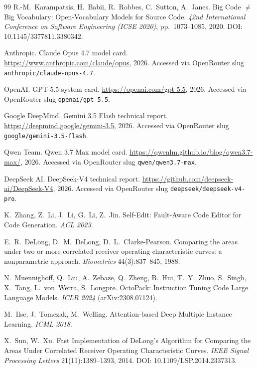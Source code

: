 \documentclass[10pt]{article}
\begin{document}
\begin{thebibliography}{99}
R.-M.~Karampatsis, H.~Babii, R.~Robbes, C.~Sutton, A.~Janes.
\newblock Big Code $\ne$ Big Vocabulary: Open-Vocabulary Models for Source
Code.
\newblock \emph{42nd International Conference on Software Engineering
(ICSE 2020)}, pp.~1073--1085, 2020.
\newblock DOI: 10.1145/3377811.3380342.

Anthropic.
\newblock Claude Opus 4.7 model card.
\newblock \url{https://www.anthropic.com/claude/opus}, 2026. Accessed via
OpenRouter slug \texttt{anthropic/claude-opus-4.7}.

OpenAI.
\newblock GPT-5.5 system card.
\newblock \url{https://openai.com/gpt-5.5}, 2026. Accessed via
OpenRouter slug \texttt{openai/gpt-5.5}.

Google DeepMind.
\newblock Gemini 3.5 Flash technical report.
\newblock \url{https://deepmind.google/gemini-3.5}, 2026. Accessed via
OpenRouter slug \texttt{google/gemini-3.5-flash}.

Qwen Team.
\newblock Qwen 3.7 Max model card.
\newblock \url{https://qwenlm.github.io/blog/qwen3.7-max/}, 2026. Accessed
via OpenRouter slug \texttt{qwen/qwen3.7-max}.

DeepSeek AI.
\newblock DeepSeek-V4 technical report.
\newblock \url{https://github.com/deepseek-ai/DeepSeek-V4}, 2026.
Accessed via OpenRouter slug \texttt{deepseek/deepseek-v4-pro}.

K.~Zhang, Z.~Li, J.~Li, G.~Li, Z.~Jin.
\newblock Self-Edit: Fault-Aware Code Editor for Code Generation.
\newblock \emph{ACL 2023}.

E.~R.~DeLong, D.~M.~DeLong, D.~L.~Clarke-Pearson.
\newblock Comparing the areas under two or more correlated receiver
operating characteristic curves: a nonparametric approach.
\newblock \emph{Biometrics} 44(3):837--845, 1988.

N.~Muennighoff, Q.~Liu, A.~Zebaze, Q.~Zheng, B.~Hui, T.~Y.~Zhuo, S.~Singh,
X.~Tang, L.~von~Werra, S.~Longpre.
\newblock OctoPack: Instruction Tuning Code Large Language Models.
\newblock \emph{ICLR 2024} (arXiv:2308.07124).

M.~Ilse, J.~Tomczak, M.~Welling.
\newblock Attention-based Deep Multiple Instance Learning.
\newblock \emph{ICML 2018}.

X.~Sun, W.~Xu.
\newblock Fast Implementation of DeLong's Algorithm for Comparing the Areas
Under Correlated Receiver Operating Characteristic Curves.
\newblock \emph{IEEE Signal Processing Letters} 21(11):1389--1393, 2014.
\newblock DOI: 10.1109/LSP.2014.2337313.


\end{thebibliography}
\end{document}
